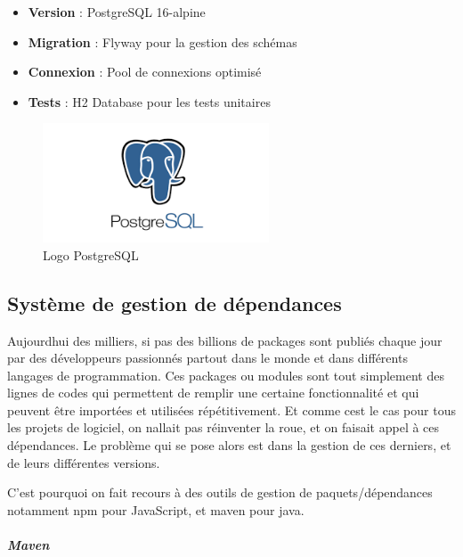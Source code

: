 \documentclass[12pt,a4paper,twoside,openright]{report}
\begin{document}
\begin{itemize}
\item
  \textbf{Version} : PostgreSQL 16-alpine
\item
  \textbf{Migration} : Flyway pour la gestion des schémas
\item
  \textbf{Connexion} : Pool de connexions optimisé
\item
  \textbf{Tests} : H2 Database pour les tests unitaires
\end{itemize}

\begin{figure}[H]
\centering
\includegraphics[width=0.6\textwidth]{latex_media/media/image26.png}
\caption{Logo PostgreSQL}
\label{fig:logo-postgresql}
\end{figure}

\hypertarget{systuxe8me-de-gestion-de-duxe9pendances}{%
\subsection{Système de gestion de
dépendances}\label{systuxe8me-de-gestion-de-duxe9pendances}}

Aujourd\textquotesingle hui des milliers, si pas des billions de
packages sont publiés chaque jour par des développeurs passionnés
partout dans le monde et dans différents langages de programmation. Ces
packages ou modules sont tout simplement des lignes de codes qui
permettent de remplir une certaine fonctionnalité et qui peuvent être
importées et utilisées répétitivement. Et comme c\textquotesingle est le
cas pour tous les projets de logiciel, on n\textquotesingle allait pas
réinventer la roue, et on faisait appel à ces dépendances. Le problème
qui se pose alors est dans la gestion de ces derniers, et de leurs
différentes versions.

C'est pourquoi on fait recours à des outils de gestion de
paquets/dépendances notamment npm pour JavaScript, et maven pour java.~

\hypertarget{maven}{%
\subparagraph{\texorpdfstring{\textbf{Maven}}{Maven}}\label{maven}}
\end{document}
